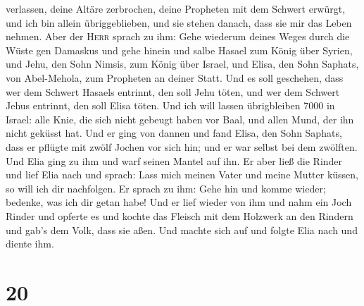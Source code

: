 verlassen, deine Altäre zerbrochen, deine Propheten mit dem Schwert
erwürgt, und ich bin allein übriggeblieben, und sie stehen danach, dass
sie mir das Leben nehmen.  Aber der \textsc{Herr} sprach
zu ihm: Gehe wiederum deines Weges durch die Wüste gen Damaskus und gehe
hinein und salbe Hasael zum König über Syrien,  und Jehu,
den Sohn Nimsis, zum König über Israel, und Elisa, den Sohn Saphats, von
Abel-Mehola, zum Propheten an deiner Statt.  Und es soll
geschehen, dass wer dem Schwert Hasaels entrinnt, den soll Jehu töten,
und wer dem Schwert Jehus entrinnt, den soll Elisa töten.
 Und ich will lassen übrigbleiben 7000 in Israel: alle
Knie, die sich nicht gebeugt haben vor Baal, und allen Mund, der ihn
nicht geküsst hat.  Und er ging von dannen und fand
Elisa, den Sohn Saphats, dass er pflügte mit zwölf Jochen vor sich hin;
und er war selbst bei dem zwölften. Und Elia ging zu ihm und warf seinen
Mantel auf ihn.  Er aber ließ die Rinder und lief Elia
nach und sprach: Lass mich meinen Vater und meine Mutter küssen, so will
ich dir nachfolgen. Er sprach zu ihm: Gehe hin und komme wieder;
bedenke, was ich dir getan habe!  Und er lief wieder von
ihm und nahm ein Joch Rinder und opferte es und kochte das Fleisch mit
dem Holzwerk an den Rindern und gab's dem Volk, dass sie aßen. Und
machte sich auf und folgte Elia nach und diente ihm.

\hypertarget{section-19}{%
\section{20}\label{section-19}}

